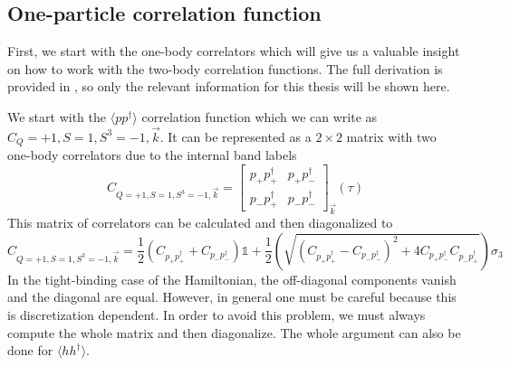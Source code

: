 \subsection{One-particle correlation function}

First, we start with the one-body correlators which will give us a valuable insight on how to work with the two-body correlation functions. The full derivation is provided in \cite{evan}, so only the relevant information for this thesis will be shown here.

We start with the $\langle pp^\dagger \rangle$ correlation function which we can write as $C_Q=+1,S=1,S^3=-1,\vec{k}$. It can be represented as a $2\times 2$ matrix with two one-body correlators due to the internal band labels
\newcommand{\corp}[2]{p_{#1}p^\dagger_{#2}}
\begin{equation}
  C_{Q=+1,S=1,S^3=-1,\vec{k}} =
  \left[
  \begin{array}{cc}
    \corp{+}{+} & \corp{+}{-} \\
    \corp{-}{+} & \corp{-}{-}
  \end{array}
  \right] _{\vec{k}} (\tau)
\end{equation}
This matrix of correlators can be calculated and then diagonalized to
\begin{equation}
  C_{Q=+1,S=1,S^3=-1,\vec{k}} = \frac{1}{2}\left(C_{\corp{+}{+}} + C_{\corp{-}{-}}\right)\mathds{1} + \frac{1}{2}\left(\sqrt{\left(C_{\corp{+}{+}} - C_{\corp{-}{-}}\right)^2 + 4 C_{\corp{+}{-}}C_{\corp{-}{+}}}\right)\sigma_3
\end{equation}
In the tight-binding case of the Hamiltonian, the off-diagonal components vanish and the diagonal are equal. However, in general one must be careful because this is discretization dependent. In order to avoid this problem, we must always compute the whole matrix and then diagonalize. The whole argument can also be done for $\langle hh^\dagger\rangle$.

